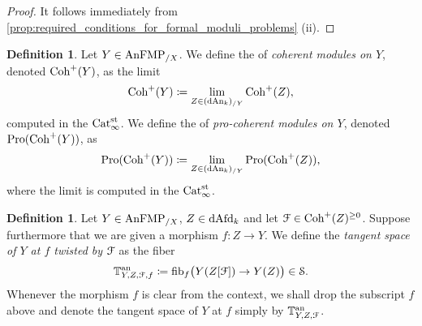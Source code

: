 \documentclass[10pt,a4paper,reqno]{amsart} %
\theoremstyle{plain}
\theoremstyle{definition}
\newtheorem{defin}[thm]{Definition}
\theoremstyle{remark}
\numberwithin{equation}{section}
\begin{document}
\begin{proof}
    It follows immediately from \cref{prop:required_conditions_for_formal_moduli_problems} (ii).
\end{proof}

\begin{defin}
    Let $Y \in \mathrm{AnFMP}_{/X}$. We define the \infcat of \emph{coherent modules on $Y$}, denoted $\mathrm{Coh}^+(Y)$, as the limit
        \[
            \mathrm{Coh}^+(Y) \coloneqq \lim_{Z \in (\mathrm{dAn}_k)_{/Y}}  \mathrm{Coh}^+(Z),
        \]
    computed in the \infcat $\mathrm{Cat}_{\infty}^{\mathrm{st}}$. We define the \infcat of \emph{pro-coherent modules on $Y$}, denoted $\mathrm{Pro}(\mathrm{Coh}^+(Y))$, as
        \[
            \mathrm{Pro}(\mathrm{Coh}^+(Y)) \coloneqq \lim_{Z \in (\mathrm{dAn}_k)_{/Y}} \mathrm{Pro}(\mathrm{Coh}^+(Z)),  
        \]
    where the limit is computed in the \infcat $\mathrm{Cat}_{\infty}^{\mathrm{st}}$.
\end{defin}

\begin{defin} Let $Y \in \mathrm{AnFMP}_{/X}$, $Z \in \mathrm{dAfd}_k$ and let $\mathcal F \in \mathrm{Coh}^+(Z)^{\ge 0}$. Suppose furthermore that we are given a morphism $f \colon Z \to Y$.
    We define the \emph{tangent space of $Y$ at $f$ twisted by $\mathcal F$} as the fiber
        \[
            \mathbb T^\mathrm{an}_{Y, Z, \mathcal F,f} \coloneqq \mathrm{fib}_f\big( Y(Z[\mathcal F]) \to Y(Z) \big) 
            \in \mathcal S.  
        \]
    Whenever the morphism $f$ is clear from the context, we shall drop the subscript $f$ above and denote the tangent space of $Y$ at $f$ simply by $\mathbb T^\mathrm{an}_{Y, Z, \mathcal F}$.
\end{defin}
\end{document}
